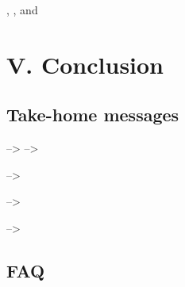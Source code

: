 \documentclass[
  12pt,
]{krantz}
\begin{document}
\citet{cubaynes_importance_2010}, \citet{gimenez_individual_2010}, and \citet{turek_bayesian_2021}

\hypertarget{part-v.-conclusion}{%
\part{V. Conclusion}\label{part-v.-conclusion}}

\hypertarget{take-home-messages}{%
\chapter*{Take-home messages}\label{take-home-messages}}


--\textgreater{}
--\textgreater{}

--\textgreater{}

--\textgreater{}

--\textgreater{}

\hypertarget{faq}{%
\chapter*{FAQ}\label{faq}}


\backmatter

  

\printindex
\end{document}
